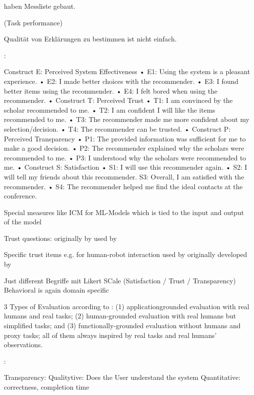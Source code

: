 \cite{tintarev_designing_nodate} haben Messliste gebaut.

(Task performance) \cite{martin_evaluating_2021}

Qualität von Erklärungen zu bestimmen ist nicht einfach.

\cite{tsai_effects_2020}:

Construct E: Perceived System Effectiveness • E1: Using the system is a pleasant experience. • E2: I made better choices with the recommender. • E3: I found better items using the recommender. • E4: I felt bored when using the recommender. • Construct T: Perceived Trust • T1: I am convinced by the scholar recommended to me. • T2: I am confident I will like the items recommended to me. • T3: The recommender made me more confident about my selection/decision. • T4: The recommender can be trusted. • Construct P: Perceived Transparency • P1: The provided information was sufficient for me to make a good decision. • P2: The recommender explained why the scholars were recommended to me. • P3: I understood why the scholars were recommended to me. • Construct S: Satisfaction • S1: I will use this recommender again. • S2: I will tell my friends about this recommender. S3: Overall, I am satisfied with the recommender. • S4: The recommender helped me find the ideal contacts at the conference.

Special measures like ICM for ML-Models which is tied to the input and output of the model \cite{waa_evaluating_2021, neerincx_using_2018}

Trust questions: originally by \cite{mayer1999effect} used by \cite{wang_is_2018}

Specific trust items e.g. for human-robot interaction used by \cite{zhu_effects_2020} originally developed by \cite{schaefer2013perception}

Just different Begriffe mit Likert SCale (Satisfaction / Trust / Transparency) \cite{koo_understanding_2016, koo_why_2015} Behavioral is again domain specific

3 Types of Evaluation according to \cite{ribera2019can, doshi2017towards}: (1) applicationgrounded evaluation with real humans and real tasks; (2) human-grounded evaluation with real humans but simplified tasks; and (3) functionally-grounded evaluation without humans and proxy tasks; all of them always inspired by real tasks and real humans’ observations.

 \cite{tintarev2007survey}:
 
 Transparency: Qualitytive: Does the User understand the system Quantitative: correctness, completion time
 
